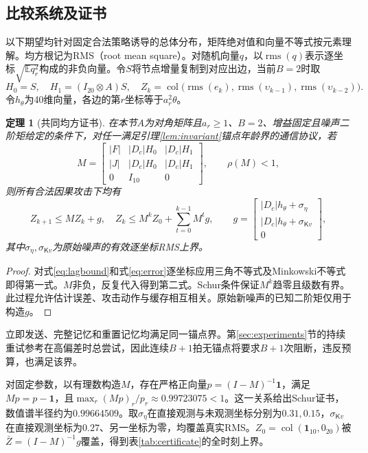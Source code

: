 \documentclass[UTF8,a4paper,zihao=5,fontset=windows]{ctexart}
\newtheorem{theorem}{定理}
\newcommand{\E}{\mathbb E}
\newcommand{\col}{\operatorname{col}}
\newcommand{\rms}{\operatorname{rms}}
\begin{document}
\subsection{比较系统及证书}
以下期望均针对固定合法策略诱导的总体分布，矩阵绝对值和向量不等式按元素理解。均方根记为RMS（root mean square）。对随机向量$q$，以$\rms(q)$表示逐坐标$\sqrt{\E q_r^2}$构成的非负向量。令$S$将节点增量复制到对应出边，当前$B=2$时取
\[
H_0=S,\quad H_1=(I_{20}\otimes A)S,\quad
Z_k=\col\big(\rms(e_k),\rms(\upsilon_{k-1}),\rms(\upsilon_{k-2})\big).
\]
令$h_\theta$为40维向量，各边的第$r$坐标等于$a_r^2\theta$。
\begin{theorem}[共同均方证书]\label{thm:certificate}
在本节$A$为对角矩阵且$a_r\ge1$、$B=2$、增益固定且噪声二阶矩给定的条件下，对任一满足引理\ref{lem:invariant}锚点年龄界的通信协议，若
\begin{equation}
M=
\begin{bmatrix}
|F|&|D_c|H_0&|D_c|H_1\\
|J|&|D_c|H_0&|D_c|H_1\\
0&I_{10}&0
\end{bmatrix},
\qquad \rho(M)<1,
\label{eq:matrix}
\end{equation}
则所有合法因果攻击下均有
\begin{equation}
Z_{k+1}\le MZ_k+g,\quad
Z_k\le M^kZ_0+\sum_{t=0}^{k-1}M^t g,\qquad
g=\begin{bmatrix}|D_c|h_\theta+\sigma_\eta\\
|D_c|h_\theta+\sigma_{\mathsf Kv}\\0\end{bmatrix},
\label{eq:comparison}
\end{equation}
其中$\sigma_\eta,\sigma_{\mathsf Kv}$为原始噪声的有效逐坐标RMS上界。
\end{theorem}
\begin{proof}
对式\eqref{eq:lagbound}和式\eqref{eq:error}逐坐标应用三角不等式及Minkowski不等式即得第一式。$M$非负，反复代入得到第二式。Schur条件保证$M^k$趋零且级数有界。此过程允许估计误差、攻击动作与缓存相互相关。原始新噪声的已知二阶矩仅用于构造$g$。
\end{proof}

立即发送、完整记忆和重置记忆均满足同一锚点界。第\ref{sec:experiments}节的持续重试参考在高偏差时总尝试，因此连续$B+1$拍无锚点将要求$B+1$次阻断，违反预算，也满足该界。

对固定参数，以有理数构造$M$，存在严格正向量$p=(I-M)^{-1}\mathbf1$，满足$Mp=p-\mathbf1$，且$\max_r(Mp)_r/p_r\approx0.99723075<1$。这一关系给出Schur证书，数值谱半径约为$0.99664509$。取$\sigma_\eta$在直接观测与未观测坐标分别为$0.31,0.15$，$\sigma_{\mathsf Kv}$在直接观测坐标为$0.27$、另一坐标为零，均覆盖真实RMS。$Z_0=\col(\mathbf1_{10},0_{20})$被$\bar Z=(I-M)^{-1}g$覆盖，得到表\ref{tab:certificate}的全时刻上界。
\end{document}
